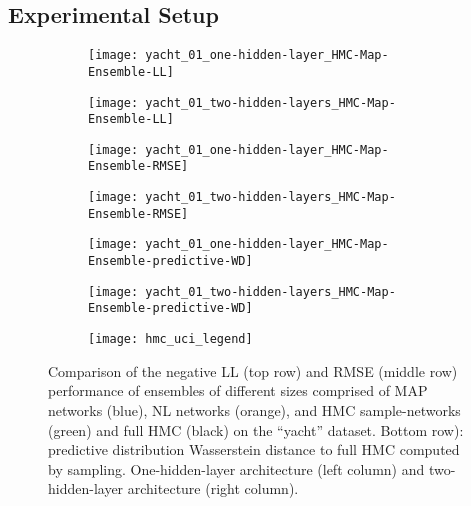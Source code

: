 \documentclass[../thesis.tex]{subfiles}
\begin{document}
\subsection*{Experimental Setup}
\begin{figure}
    \centering
    \begin{subfigure}{0.49\textwidth}
        \texttt{[image: yacht\_01\_one-hidden-layer\_HMC-Map-Ensemble-LL]} 
    \end{subfigure}
    \begin{subfigure}{0.49\textwidth}
        \texttt{[image: yacht\_01\_two-hidden-layers\_HMC-Map-Ensemble-LL]} 
    \end{subfigure}
    
    \begin{subfigure}{0.49\textwidth}
        \texttt{[image: yacht\_01\_one-hidden-layer\_HMC-Map-Ensemble-RMSE]} 
    \end{subfigure}
    \begin{subfigure}{0.49\textwidth}
        \texttt{[image: yacht\_01\_two-hidden-layers\_HMC-Map-Ensemble-RMSE]} 
    \end{subfigure}
    
    \begin{subfigure}{0.49\textwidth}
        \texttt{[image: yacht\_01\_one-hidden-layer\_HMC-Map-Ensemble-predictive-WD]} 
    \end{subfigure}
    \begin{subfigure}{0.49\textwidth}
        \texttt{[image: yacht\_01\_two-hidden-layers\_HMC-Map-Ensemble-predictive-WD]} 
    \end{subfigure}
    
    \begin{subfigure}{\textwidth}
        \centering
        \texttt{[image: hmc\_uci\_legend]} 
    \end{subfigure}
    
    \caption{Comparison of the negative LL (top row) and RMSE (middle row) performance of ensembles of different sizes comprised of MAP networks (blue), NL networks (orange), and HMC sample-networks (green) and full HMC (black) on the ``yacht'' dataset. Bottom row): predictive distribution Wasserstein distance to full HMC computed by sampling. One-hidden-layer architecture (left column)  and two-hidden-layer architecture (right column).}
    \label{fig:yacht_hmc_comparison}
\end{figure}
\end{document}
